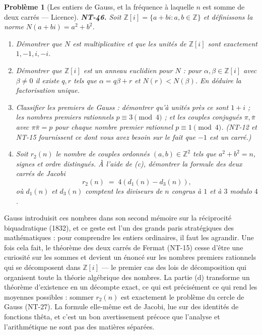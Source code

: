 \documentclass[11pt]{article}
\newtheorem{problem}{Problème}
\begin{document}
\begin{problem}[{Les entiers de Gauss, et la fréquence à laquelle $ n $ est somme de deux carrés --- Licence}]
\textbf{NT-46.} Soit $ \mathbb{Z}[i] = \{ a + bi : a, b \in \mathbb{Z} \} $ et définissons la
norme $ N(a + bi) = a^2 + b^2 $.
\begin{enumerate}
\item[(a)] Démontrer que $ N $ est multiplicative et que les unités de $ \mathbb{Z}[i] $ sont exactement
$ 1, -1, i, -i $.
\item[(b)] Démontrer que $ \mathbb{Z}[i] $ est un anneau euclidien pour $ N $ : pour
$ \alpha, \beta \in \mathbb{Z}[i] $ avec $ \beta \ne 0 $ il existe $ q, r $ tels que
$ \alpha = q\beta + r $ et $ N(r) < N(\beta) $. En déduire la factorisation unique.
\item[(c)] Classifier les premiers de Gauss : démontrer qu'à unités près ce sont $ 1 + i $ ; les nombres
premiers rationnels $ p \equiv 3 \pmod 4 $ ; et les couples conjugués $ \pi, \bar{\pi} $ avec
$ \pi \bar{\pi} = p $ pour chaque nombre premier rationnel $ p \equiv 1 \pmod 4 $. (NT-12 et
NT-15 fournissent ce dont vous avez besoin sur le fait que $ -1 $ est un carré.)
\item[(d)] Soit $ r_2(n) $ le nombre de couples ordonnés $ (a,b) \in \mathbb{Z}^2 $ tels que
$ a^2 + b^2 = n $, signes et ordre distingués. À l'aide de (c), démontrer la formule des deux
carrés de Jacobi
\[ r_2(n) \;=\; 4\left( d_1(n) - d_3(n) \right), \]
où $ d_1(n) $ et $ d_3(n) $ comptent les diviseurs de $ n $ congrus à $ 1 $ et à
$ 3 $ modulo $ 4 $.
\end{enumerate}

\end{problem}

\noindent Gauss introduisit ces nombres dans son second mémoire sur la réciprocité
biquadratique (1832), et ce geste est l'un des grands paris stratégiques des mathématiques : pour
comprendre les entiers ordinaires, il faut les agrandir. Une fois cela fait, le théorème des deux
carrés de Fermat (NT-15) cesse d'être une curiosité sur les sommes et devient un énoncé sur les
nombres premiers rationnels qui se décomposent dans $ \mathbb{Z}[i] $ --- le premier cas des lois de
décomposition qui organisent toute la théorie algébrique des nombres. La partie (d) transforme un
théorème d'existence en un décompte exact, ce qui est précisément ce qui rend les moyennes
possibles : sommer $ r_2(n) $ est exactement le problème du cercle de Gauss (NT-27). La formule
elle-même est de Jacobi, lue sur des identités de fonctions thêta, et c'est un bon avertissement
précoce que l'analyse et l'arithmétique ne sont pas des matières séparées.
\end{document}
